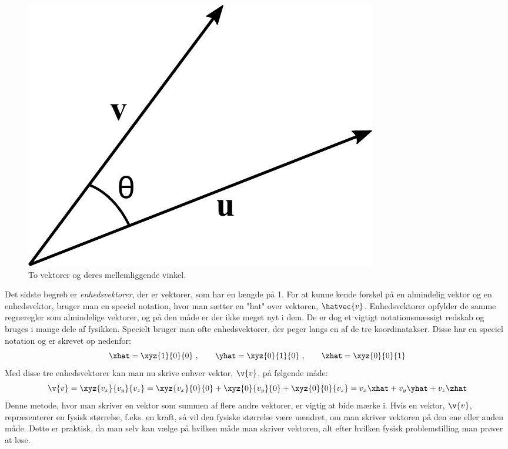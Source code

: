 \begin{figure}[h!]
	\centering
	\includegraphics[scale=0.7]{matematik/fig/dot_cross.pdf}
	\caption{To vektorer og deres mellemliggende vinkel.}
	\label{dot_cross}
\end{figure}
Det sidste begreb er \emph{enhedsvektorer}, der er vektorer, som har en længde på 1. For at kunne kende forskel på en almindelig vektor og en enhedsvektor, bruger man en speciel notation, hvor man sætter en "hat" over vektoren, $\hatvec{v}$. Enhedsvektorer opfylder de samme regneregler som almindelige vektorer, og på den måde er der ikke meget nyt i dem. De er dog et vigtigt notationsmæssigt redskab og bruges i mange dele af fysikken. Specielt bruger man ofte enhedsvektorer, der peger langs en af de tre koordinatakser. Disse har en speciel notation og er skrevet op nedenfor:
\begin{equation}
\xhat = \xyz{1}{0}{0} \ , \quad \quad \yhat = \xyz{0}{1}{0} \ , \quad \quad \zhat = \xyz{0}{0}{1}
\end{equation}
Med disse tre enhedsvektorer kan man nu skrive enhver vektor, $\v{v}$, på følgende måde:
$$\v{v} = \xyz{v_x}{v_y}{v_z} = \xyz{v_x}{0}{0} + \xyz{0}{v_y}{0} + \xyz{0}{0}{v_z} = v_x \xhat + v_y \yhat + v_z \zhat$$
Denne metode, hvor man skriver en vektor som summen af flere andre vektorer, er vigtig at bide mærke i. Hvis en vektor, $\v{v}$, repræsenterer en fysisk størrelse, f.eks. en kraft, så vil den fysiske størrelse være uændret, om man skriver vektoren på den ene eller anden måde. Dette er praktisk, da man selv kan vælge på hvilken måde man skriver vektoren, alt efter hvilken fysisk problemstilling man prøver at løse. 